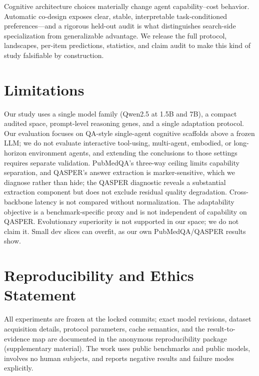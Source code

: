 \documentclass[11pt]{article}
\begin{document}
Cognitive architecture choices materially change agent capability--cost
behavior. Automatic co-design exposes clear, stable, interpretable
task-conditioned preferences---and a rigorous held-out audit is what
distinguishes search-side specialization from generalizable advantage. We
release the full protocol, landscapes, per-item predictions, statistics, and
claim audit to make this kind of study falsifiable by construction.

\section{Limitations}

Our study uses a single model family (Qwen2.5 at 1.5B and 7B), a compact
audited space, prompt-level reasoning genes, and a single adaptation
protocol. Our evaluation focuses on QA-style single-agent cognitive
scaffolds above a frozen LLM; we do not evaluate interactive tool-using,
multi-agent, embodied, or long-horizon environment agents, and extending the
conclusions to those settings requires separate validation. PubMedQA's
three-way ceiling limits capability separation, and QASPER's answer
extraction is marker-sensitive, which we diagnose rather than hide; the
QASPER diagnostic reveals a substantial extraction component but does not
exclude residual quality degradation. Cross-backbone latency is not compared
without normalization. The adaptability objective is a benchmark-specific
proxy and is not independent of capability on QASPER. Evolutionary
superiority is not supported in our space; we do not claim it. Small dev
slices can overfit, as our own PubMedQA/QASPER results show.

\section{Reproducibility and Ethics Statement}
\label{sec:repro}

All experiments are frozen at the locked commits; exact model revisions,
dataset acquisition details, protocol parameters, cache semantics, and the
result-to-evidence map are documented in the anonymous reproducibility
package (supplementary material). The work uses public benchmarks and public
models, involves no human subjects, and reports negative results and failure
modes explicitly.


\end{document}
